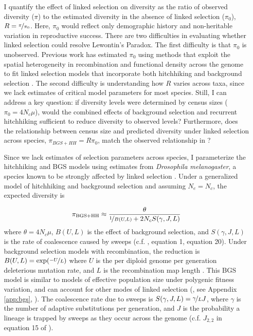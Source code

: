 \documentclass[9pt,lineno]{elife}
\begin{document}
I quantify the effect of linked selection on diversity as the ratio of observed
diversity ($\pi$) to the estimated diversity in the absence of linked selection
($\pi_0$), $R = \nicefrac{\pi}{\pi_0}$. Here, $\pi_0$ would reflect only
demographic history and non-heritable variation in reproductive success. There
are two difficulties in evaluating whether linked selection could resolve
Lewontin's Paradox. The first difficulty is that $\pi_0$ is unobserved.
Previous work has estimated $\pi_0$ using methods that exploit the spatial
heterogeneity in recombination and functional density across the genome to fit
linked selection models that incorporate both hitchhiking and background
selection \citep{Elyashiv2016-vt,Corbett-Detig2015-gt}. The second difficulty
is understanding how $R$ varies across taxa, since we lack estimates of
critical model parameters for most species. Still, I can address a key
question: if diversity levels were determined by census sizes ($\pi_0 = 4N_c
\mu$), would the combined effects of background selection and recurrent
hitchhiking sufficient to reduce diversity to observed levels? Furthermore,
does the relationship between census size and predicted diversity under linked
selection across species, $\pi_{BGS+HH} = R \pi_0$, match the observed
relationship in ? 

Since we lack estimates of selection parameters across species, I parameterize
the hitchhiking and BGS models using estimates from \emph{Drosophila
melanogaster}, a species known to be strongly affected by linked selection
\citep{Sella2009-nx}. Under a generalized model of hitchhiking and background
selection \citep{Elyashiv2016-vt,Coop2012-cd} and assuming $N_e = N_c$,
the expected diversity is

\begin{align} 
  \pi_\text{BGS+HH} \approx \frac{\theta}{\nicefrac{1}{B(U, L)} + 2N_c S(\gamma, J, L)} 
  \label{eqn:div} 
\end{align}
%
where $\theta = 4N_c\mu$, $B(U,L)$ is the effect of background selection, and
$S(\gamma, J, L)$ is the rate of coalescence caused by sweeps (c.f.
\cite{Elyashiv2016-vt}, equation 1, \cite{Coop2012-cd} equation 20). Under
background selection models with recombination, the reduction is $B(U,L) =
\exp(\nicefrac{-U}{L})$ where $U$ is the per diploid genome per generation
deleterious mutation rate, and $L$ is the recombination map length
\citep{Hudson1994-oh,Hudson1995-xc,Nordborg1996-nq}. This BGS model is
similar to models of effective population size under polygenic fitness
variation, and can account for other modes of linked selection
(\cite{Robertson1961-ho,Santiago1995-hx,Santiago1998-bs}, see Appendix 
\ref{app:bgs}, ). The coalescence rate due to sweeps is $S(\gamma,J,L) =
\nicefrac{\gamma}{L} J$, where $\gamma$ is the number of adaptive substitutions
per generation, and $J$ is the probability a lineage is trapped by sweeps as
they occur across the genome (c.f. $J_{2,2}$ in equation 15 of
\cite{Coop2012-cd}). 
\end{document}
